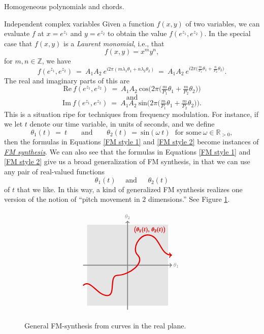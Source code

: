 \documentclass[letterpaper,11pt, reqno]{amsart}
\newtheorem{monodromy theorem}{Monodromy Theorem}[subsection]
\newtheorem{wild conjecture}[theorem]{Wild Conjecture}
\newtheorem{research objectives}{Research objectives}[subsection]
\newtheorem{research question}[theorem]{Research questions}
\newtheorem{aside question}[theorem]{Aside question}
\newtheorem{audio example}[theorem]{\loudspeaker[3] Example}
\newtheorem{blank remark}[theorem]{}
\newtheorem{terminology and comment}[theorem]{Terminology and comment}
\newtheorem{purity hypothesis}[theorem]{Purity hypothesis}
\newtheorem{corollary of the purity hypothesis}[theorem]{Corollary of the purity hypothesis}
\newcommand{\RR} {{\mathbb R}}
\newcommand{\ZZ} {{\mathbb Z}}
\numberwithin{equation}{theorem}
\begin{document}
\begin{section}{Homogeneous polynomials and chords.}
\begin{subsection}{Independent complex variables}
Given a function $f(x,y)$ of two variables, we can evaluate $f$ at $x=e^{z_1}$ and $y=e^{z_2}$ to obtain the value $f(e^{z_1},e^{z_2})$. In the special case that $f(x,y)$ is a {\em Laurent monomial}, i.e., that
	$$
	f(x,y)=x^my^n,
	$$
for $m,n\in\ZZ$, we have
	$$
	f(e^{z_1}, e^{z_2})
	\ =\ 
	A_1A_2\ e^{i2\pi (m\lambda_1\theta_1+n\lambda_2\theta_2)}
	\ =\ 
	A_1A_2\ e^{i2\pi\big(\tfrac{m}{P_1}\theta_1+\tfrac{n}{P_2}\theta_2\big)}.
	$$
The real and imaginary parts of this are
	\begin{equation}\label{FM style 1}
	\text{Re}\ f(e^{z_1}, e^{z_2})
	\ =\ 
	A_1A_2\ \text{cos}\Big(2\pi\big(\tfrac{m}{P_1}\theta_1+\tfrac{m}{P_2}\theta_2\big)\Big)
	\end{equation}
	$$
	\ \ \ \ \ \ \text{and}\ \ \ \ \ \ 
	$$
	\begin{equation}\label{FM style 2}
	\text{Im}\ f(e^{z_1}, e^{z_2})
	\ =\ 
	A_1A_2\ \text{sin}\Big(2\pi\big(\tfrac{m}{P_1}\theta_1+\tfrac{m}{P_2}\theta_2\big)\Big)
	.
	\end{equation}
This is a situation ripe for techniques from frequency modulation. For instance, if we let $t$ denote our time variable, in units of seconds, and we define
	$$
	\theta_1(t)\ =\ t
	\ \ \ \ \ \ \ \ \ \text{and}\ \ \ \ \ \ \ \ \ 
	\theta_2(t)\ =\ \text{sin}(\omega\ \!t)\ \ \ \text{for some}\ \omega\in\RR_{>0},
	$$
then the formulas in Equations \eqref{FM style 1} and \eqref{FM style 2} become instances of \href{https://en.wikipedia.org/wiki/Frequency_modulation_synthesis}{{\em FM synthesis}}. We can also see that the formulas in Equations \eqref{FM style 1} and \eqref{FM style 2} give us a broad generalization of FM synthesis, in that we can use any pair of real-valued functions
	$$
	\theta_1(t)\ \ \ \ \ \ \text{and}\ \ \ \ \ \ \ \theta_2(t)
	$$
of $t$ that we like. In this way, a kind of generalized FM synthesis realizes one version of the notion of ``pitch movement in $2$ dimensions.'' See Figure \ref{figure: ring modulation 2 dimensions}.
	\begin{figure}[ht]
	$$
	\begin{tikzpicture}
	\fill[black!10] (2,2) -- (-2,2) -- (-2, -2) -- (2, -2) -- cycle;
	\draw[black!50, very thick, ->] (-2.2,0) -- (2.2,0);
	\draw[black!50, very thick, ->] (0,-2.2) -- (0,2.2);
	\draw[red!90!black!100, ultra thick, ->] (-2.2,-1) to [out=45, in=180] (-1,-1.5) to [out=0, in=180] (-.5,-.5) to [out=0, in=-45] (.5,.5) to [out=135, in=180] (1, 1.5) to [out=0, in=180] (2.2,.5);
	\node[black!50] at (2.4, 0) {\scalebox{.8}{$\theta_1$}};
	\node[black!50] at (0, 2.4) {\scalebox{.8}{$\theta_2$}};	
	\node[red!90!black!100] at (1.1, 1.75) {\scalebox{.8}{$\pmb{\big(\theta_1(t),\ \!\theta_2(t)\big)}$}};
	\end{tikzpicture}
	$$
	\caption{General FM-synthesis from curves in the real plane.}
	\label{figure: ring modulation 2 dimensions}
	\end{figure}


\end{subsection}
\end{section}
\end{document}
